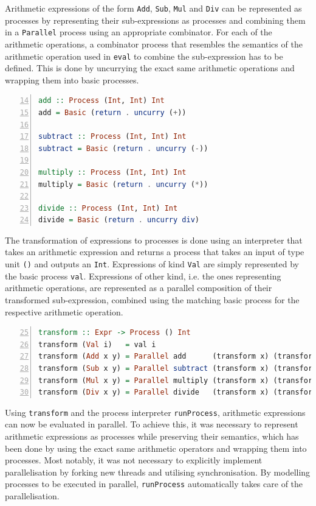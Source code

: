 Arithmetic expressions of the form \texttt{Add}, \texttt{Sub}, \texttt{Mul} and \texttt{Div} can be represented as processes by representing their sub-expressions as processes and combining them in a \texttt{Parallel} process using an appropriate combinator.  For each of the arithmetic operations, a combinator process that resembles the semantics of the arithmetic operation used in \texttt{eval} to combine the sub-expression has to be defined. This is done by uncurrying the exact same arithmetic operations and wrapping them into basic processes.
\begin{lstlisting}[language=Haskell, caption=Basic processes for the combination of results from processes that have been executed in parallel., label=lst:arith_combinators,numbers=left, frame=bt, firstnumber=14]
add :: Process (Int, Int) Int
add = Basic (return . uncurry (+))

subtract :: Process (Int, Int) Int
subtract = Basic (return . uncurry (-))

multiply :: Process (Int, Int) Int
multiply = Basic (return . uncurry (*))

divide :: Process (Int, Int) Int
divide = Basic (return . uncurry div)
\end{lstlisting}

The transformation of expressions to processes is done using an interpreter \cite{Gamma:1995:DPE:186897} that takes an arithmetic expression and returns a process that takes an input of type unit \texttt{()} and outputs an \texttt{Int}. Expressions of kind \texttt{Val} are simply represented by the basic process \texttt{val}. Expressions of other kind, i.e. the ones representing arithmetic operations, are represented as a parallel composition of their transformed sub-expression, combined using the matching basic process for the respective arithmetic operation.
\begin{lstlisting}[language=Haskell, caption=Transformation from arithmetic expressions to processes., label=lst:arith_transformation, numbers=left, frame=bt, firstnumber=25, basicstyle=\footnotesize\ttfamily]
transform :: Expr -> Process () Int
transform (Val i)   = val i
transform (Add x y) = Parallel add      (transform x) (transform y)
transform (Sub x y) = Parallel subtract (transform x) (transform y)
transform (Mul x y) = Parallel multiply (transform x) (transform y)
transform (Div x y) = Parallel divide   (transform x) (transform y)
\end{lstlisting}

Using \texttt{transform} and the process interpreter \texttt{runProcess}, arithmetic expressions can now be evaluated in parallel. To achieve this, it was necessary to represent arithmetic expressions as processes while preserving their semantics, which has been done by using the exact same arithmetic operators and wrapping them into processes. Most notably, it was not necessary to explicitly implement parallelisation by forking new threads and utilising synchronisation. By modelling processes to be executed in parallel, \texttt{runProcess} automatically takes care of the parallelisation.